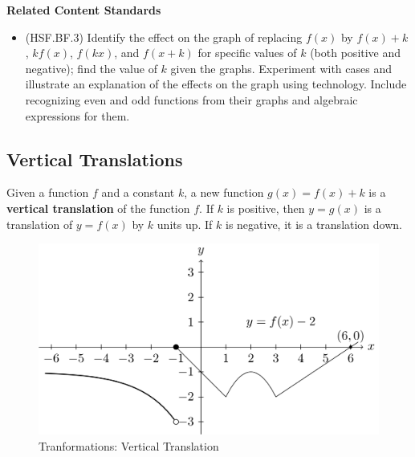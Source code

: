 \documentclass[
]{book}
\providecommand{\tightlist}{%
  \setlength{\itemsep}{0pt}\setlength{\parskip}{0pt}}
\newenvironment{standards}{}{}
\theoremstyle{definition}
\theoremstyle{definition}
\theoremstyle{definition}
\theoremstyle{definition}
\theoremstyle{remark}
\begin{document}
\begin{standards}

\begin{center}
\textbf{Related Content Standards}

\end{center}

\begin{itemize}
\tightlist
\item
  (HSF.BF.3) Identify the effect on the graph of replacing \(f(x)\) by \(f(x) + k\), \(k f(x)\), \(f(kx)\), and \(f(x + k)\) for specific values of \(k\) (both positive and negative); find the value of \(k\) given the graphs. Experiment with cases and illustrate an explanation of the effects on the graph using technology. Include recognizing even and odd functions from their graphs and algebraic expressions for them.
\end{itemize}

\end{standards}

\hypertarget{vertical-translations}{%
\subsection{Vertical Translations}\label{vertical-translations}}

Given a function \(f\) and a constant \(k\), a new function \(g(x)=f(x)+k\) is a \textbf{vertical translation} of the function \(f\). If \(k\) is positive, then \(y=g(x)\) is a translation of \(y=f(x)\) by \(k\) units up. If \(k\) is negative, it is a translation down.

\begin{figure}

{\centering \includegraphics[width=0.8\linewidth]{tikz/vertical-translation} 

}

\caption{Tranformations: Vertical Translation}\label{fig:vertical-translation}
\end{figure}
\end{document}
